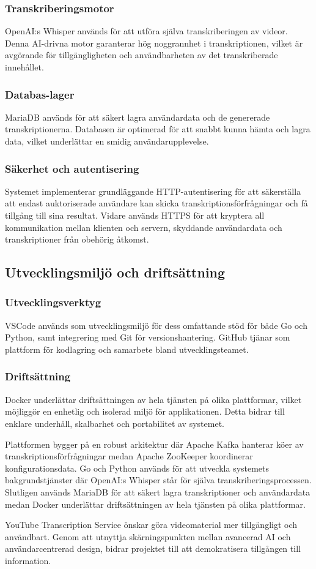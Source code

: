 \subsubsection{Transkriberingsmotor} OpenAI:s Whisper används för att utföra själva
transkriberingen av videor. Denna AI-drivna motor garanterar hög noggrannhet i
transkriptionen, vilket är avgörande för tillgängligheten och användbarheten
av det transkriberade innehållet.
\subsubsection{Databas-lager}
MariaDB används för att säkert lagra användardata och de genererade
transkriptionerna. Databasen är optimerad för att snabbt kunna hämta och
lagra data, vilket underlättar en smidig användarupplevelse.

\subsubsection{Säkerhet och autentisering}
Systemet implementerar grundläggande HTTP-autentisering för att säkerställa
att endast auktoriserade användare kan skicka transkriptionsförfrågningar och
få tillgång till sina resultat. Vidare används HTTPS för att kryptera all
kommunikation mellan klienten och servern, skyddande användardata och
transkriptioner från obehörig åtkomst.

\subsection{Utvecklingsmiljö och driftsättning}

\subsubsection{Utvecklingsverktyg}
VSCode används som utvecklingsmiljö för dess omfattande
stöd för både Go och Python, samt integrering med Git för versionshantering.
GitHub tjänar som plattform för kodlagring och samarbete bland
utvecklingsteamet.

\subsubsection{Driftsättning}
Docker underlättar driftsättningen av hela tjänsten på olika
plattformar, vilket möjliggör en enhetlig och isolerad miljö för
applikationen. Detta bidrar till enklare underhåll, skalbarhet och
portabilitet av systemet.

Plattformen bygger på en robust arkitektur där Apache Kafka hanterar köer av
transkriptionsförfrågningar medan Apache ZooKeeper koordinerar
konfigurationsdata. Go och Python används för att utveckla systemets
bakgrundstjänster där OpenAI:s Whisper står för själva
transkriberingsprocessen. Slutligen används MariaDB för att säkert lagra
transkriptioner och användardata medan Docker underlättar driftsättningen av
hela tjänsten på olika plattformar.

YouTube Transcription Service önskar göra videomaterial mer tillgängligt och
användbart. Genom att utnyttja skärningspunkten mellan avancerad AI och
användarcentrerad design, bidrar projektet till att demokratisera tillgången
till information.
